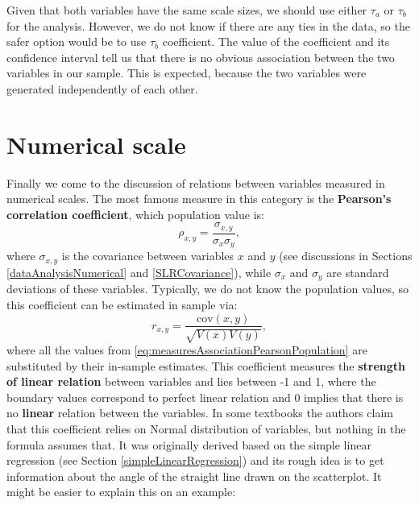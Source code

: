 \documentclass[
]{book}
\theoremstyle{definition}
\theoremstyle{definition}
\theoremstyle{definition}
\theoremstyle{definition}
\theoremstyle{remark}
\begin{document}
Given that both variables have the same scale sizes, we should use either \(\tau_a\) or \(\tau_b\) for the analysis. However, we do not know if there are any ties in the data, so the safer option would be to use \(\tau_b\) coefficient. The value of the coefficient and its confidence interval tell us that there is no obvious association between the two variables in our sample. This is expected, because the two variables were generated independently of each other.

\hypertarget{correlationCoefficient}{%
\section{Numerical scale}\label{correlationCoefficient}}

Finally we come to the discussion of relations between variables measured in numerical scales. The most famous measure in this category is the \textbf{Pearson's correlation coefficient}, which population value is:
\begin{equation}
    \rho_{x,y} = \frac{\sigma_{x,y}}{\sigma_x \sigma_y},
    \label{eq:measuresAssociationPearsonPopulation}
\end{equation}
where \(\sigma_{x,y}\) is the covariance between variables \(x\) and \(y\) (see discussions in Sections \ref{dataAnalysisNumerical} and \ref{SLRCovariance}), while \(\sigma_x\) and \(\sigma_y\) are standard deviations of these variables. Typically, we do not know the population values, so this coefficient can be estimated in sample via:
\begin{equation}
    r_{x,y} = \frac{\mathrm{cov}(x,y)}{\sqrt{V(x)V(y)}},
    \label{eq:measuresAssociationPearson}
\end{equation}
where all the values from \eqref{eq:measuresAssociationPearsonPopulation} are substituted by their in-sample estimates. This coefficient measures the \textbf{strength of linear relation} between variables and lies between -1 and 1, where the boundary values correspond to perfect linear relation and 0 implies that there is no \textbf{linear} relation between the variables. In some textbooks the authors claim that this coefficient relies on Normal distribution of variables, but nothing in the formula assumes that. It was originally derived based on the simple linear regression (see Section \ref{simpleLinearRegression}) and its rough idea is to get information about the angle of the straight line drawn on the scatterplot. It might be easier to explain this on an example:
\end{document}
